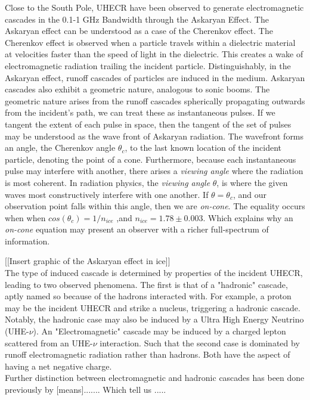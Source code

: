 \documentclass[amsmath,amssymb,aps,prd,10pt,twocolumn,showkeys]{revtex4}
\begin{document}
Close to the South Pole, UHECR have been observed to generate electromagnetic cascades in the 0.1-1 GHz Bandwidth through the Askaryan Effect. The Askaryan effect can be understood as a case of the Cherenkov effect. The Cherenkov effect is observed when a particle travels within a dielectric material at velocities faster than the speed of light in the dielectric. This creates a wake of electromagnetic radiation trailing the incident particle. Distinguishably, in the Askaryan effect, runoff cascades of particles are induced in the medium. 
Askaryan cascades also exhibit a geometric nature, analogous to sonic booms. The geometric nature arises from the runoff cascades spherically propagating outwards from the incident's path, we can treat these as instantaneous pulses. If we tangent the extent of each pulse in space, then the tangent of the set of pulses may be understood as the wave front of Askaryan radiation. The wavefront forms an angle, the Cherenkov angle $\theta_c$, to the last known location of the incident particle, denoting the point of a cone. 
Furthermore, because each instantaneous pulse may interfere with another, there arises a \textit{viewing angle} where the radiation is most coherent. In radiation physics, the \textit{viewing angle} $\theta$, is where the given waves most constructively interfere with one another. If $\theta = \theta_c$, and our observation point falls within this angle, then we are \textit{on-cone}. The equality occurs when when $cos(\theta_c) = 1/n_{ice}$ ,and $n_{ice} = 1.78 \pm 0.003$. Which explains why an \textit{on-cone} equation may present an observer with a richer full-spectrum of information.

[[Insert graphic of the Askaryan effect in ice]] \\

The type of induced cascade is determined by properties of the incident UHECR, leading to two observed phenomena. The first is that of a "hadronic" cascade, aptly named so because of the hadrons interacted with. For example, a proton may be the incident UHECR and strike a nucleus, triggering a hadronic cascade. Notably, the hadronic case may also be induced by a Ultra High Energy Neutrino (UHE-$\nu$). An "Electromagnetic" cascade may be induced by a charged lepton scattered from an UHE-$\nu$ interaction. Such that the second case is dominated by runoff electromagnetic radiation rather than hadrons. Both have the aspect of having a net negative charge.  \\

Further distinction between electromagnetic and hadronic cascades has been done previously by [means]....... Which tell us ..... \\
\end{document}
